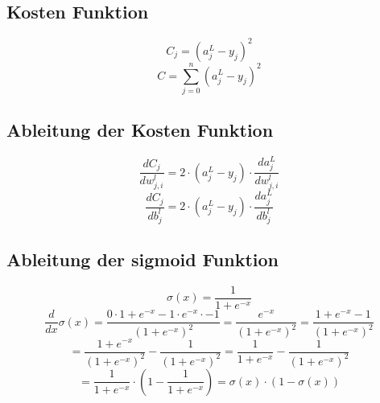 \documentclass{article}
\begin{document}
\subsection{Kosten Funktion}
\[ C_j = (a_j^L - y_j)^2 \]
\[ C = \sum_{j=0}^{n} (a_j^L - y_j)^2 \]
\subsection{Ableitung der Kosten Funktion}
\[ \frac{dC_j}{dw_{j,i}^l}  = 2 \cdot (a_j^L - y_j) \cdot \frac{da_j^L}{dw_{j,i}^l} \]
\[ \frac{dC_j}{db_j^l}  = 2 \cdot (a_j^L - y_j) \cdot \frac{da_j^L}{db_j^l} \]


\subsection{Ableitung der sigmoid Funktion}
\[\sigma(x) = \frac{1}{1 + e^{-x}}\]
\[ \frac{d}{dx}\sigma(x) = \frac{
0 \cdot 1 + e^{-x} - 1 \cdot e^{-x} \cdot -1
}{
    (1 + e^{-x})^2
} = \frac{e^{-x}}{(1 + e^{-x})^2}
= \frac{1 + e^{-x} - 1}{(1 + e^{-x})^2} \]
\[ =\frac{1 + e^{-x}}{(1 + e^{-x})^2} - \frac{1}{(1 + e^{-x})^2} 
= \frac{1}{1 + e^{-x}} - \frac{1}{(1 + e^{-x})^2} \]
\[ = \frac{1}{1 + e^{-x}} \cdot (1 - \frac{1}{1 + e^{-x}}) 
= \sigma(x) \cdot (1 - \sigma(x)) \]
\end{document}

